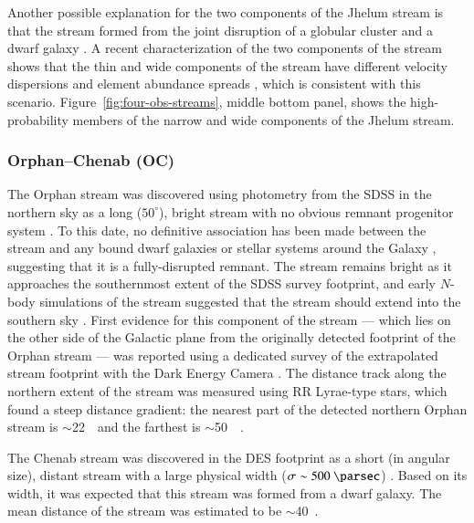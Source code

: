 \documentclass[final,5p,times,twocolumn,authoryear]{elsarticle}
\begin{document}
Another possible explanation for the two components of the Jhelum stream is that the
stream formed from the joint disruption of a globular cluster and a dwarf galaxy
\citep{bonaca:2019}.
A recent characterization of the two components of the stream shows that the thin and
wide components of the stream have different velocity dispersions and element abundance
spreads \citep{awad:2024}, which is consistent with this scenario.
Figure~\ref{fig:four-obs-streams}, middle bottom panel, shows the high-probability
members of the narrow and wide components of the Jhelum stream.




\subsubsection{Orphan--Chenab (OC)}
\label{sec:oc}

The Orphan stream was discovered using photometry from the SDSS in the northern sky as a
long ($50^\circ$), bright stream with no obvious remnant progenitor system
\citep{belokurov:2006, grillmair:2006-orphan, belokurov:2007}.
To this date, no definitive association has been made between the stream and any bound
dwarf galaxies or stellar systems around the Galaxy \citep{fellhauer:2007, newberg:2010,
casey:2013, casey:2014, grillmair:2015}, suggesting that it is a fully-disrupted
remnant.
The stream remains bright as it approaches the southernmost extent of the SDSS survey
footprint, and early $N$-body simulations of the stream suggested that the stream should
extend into the southern sky \citep[e.g.,][]{sales:2008}.
First evidence for this component of the stream --- which lies on the other side of the
Galactic plane from the originally detected footprint of the Orphan stream --- was
reported using a dedicated survey of the extrapolated stream footprint with the Dark
Energy Camera \citep{grillmair:2015}.
The distance track along the northern extent of the stream was measured using RR
Lyrae-type stars, which found a steep distance gradient: the nearest part of the
detected northern Orphan stream is $\sim$22~\kpc\ and the farthest is $\sim$50~\kpc\
\citep{sesar:2013, hendel:2018}.

The Chenab stream was discovered in the DES footprint as a short (in angular size),
distant stream with a large physical width ($\sigma \sim 500~\unit{\parsec}$)
\citep{shipp:2018}. Based on its width, it was expected that this stream was formed from
a dwarf galaxy. The mean distance of the stream was estimated to be $\sim$40~\kpc.
\end{document}
